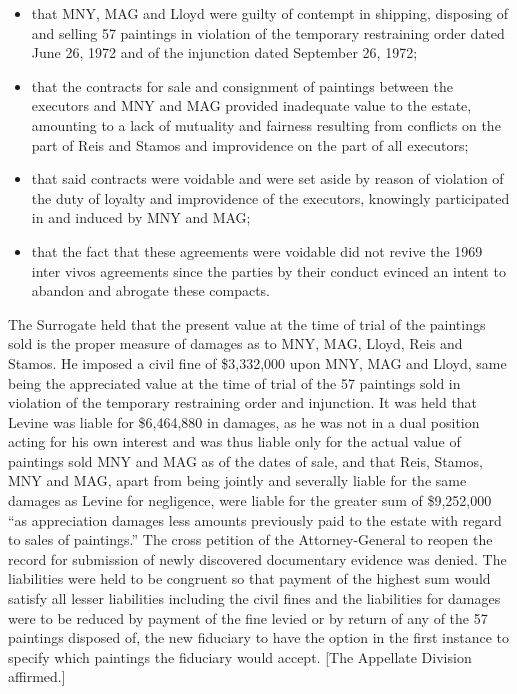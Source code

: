 \begin{itemize}
\item that MNY,
MAG and Lloyd were guilty of contempt in shipping, disposing of and selling 57
paintings in violation of the temporary restraining order dated June 26, 1972
and of the injunction dated September 26, 1972;
\item that the contracts for sale and
consignment of paintings between the executors and MNY and MAG provided
inadequate value to the estate, amounting to a lack of mutuality and fairness
resulting from conflicts on the part of Reis and Stamos and improvidence on the
part of all executors;
\item that said contracts were voidable and were set aside by
reason of violation of the duty of loyalty and improvidence of the executors,
knowingly participated in and induced by MNY and MAG;
\item that the fact that these
agreements were voidable did not revive the 1969 inter vivos agreements since
the parties by their conduct evinced an intent to abandon and abrogate these
compacts.
\end{itemize}
The Surrogate held that the present value at the time of trial of the
paintings sold is the proper measure of damages as to MNY, MAG, Lloyd, Reis and
Stamos. He imposed a civil fine of \$3,332,000 upon MNY, MAG and Lloyd, same
being the appreciated value at the time of trial of the 57 paintings sold in
violation of the temporary restraining order and injunction. It was held that
Levine was liable for \$6,464,880 in damages, as he was not in a dual position
acting for his own interest and was thus liable only for the actual value of
paintings sold MNY and MAG as of the dates of sale, and that Reis, Stamos, MNY
and MAG, apart from being jointly and severally liable for the same damages as
Levine for negligence, were liable for the greater sum of \$9,252,000 ``as
appreciation damages less amounts previously paid to the estate with regard to
sales of paintings.'' The cross petition of the Attorney-General to reopen the
record for submission of newly discovered documentary evidence was denied. The
liabilities were held to be congruent so that payment of the highest sum would
satisfy all lesser liabilities including the civil fines and the liabilities for
damages were to be reduced by payment of the fine levied or by return of any of
the 57 paintings disposed of, the new fiduciary to have the option in the first
instance to specify which paintings the fiduciary would accept. [The Appellate
Division affirmed.]


